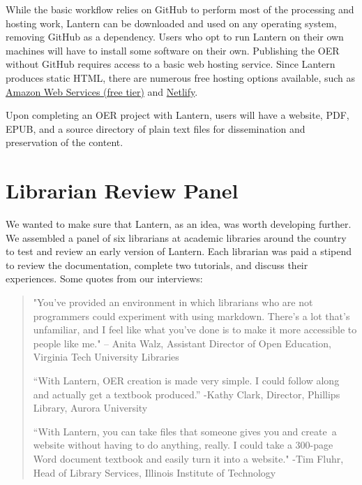 \documentclass{book}
\begin{document}
While the basic workflow relies on GitHub to perform most of the processing
and hosting work, Lantern can be downloaded and used on any operating system,
removing GitHub as a dependency. Users who opt to run Lantern on their own
machines will have to install some software on their own. Publishing the OER
without GitHub requires access to a basic web hosting service. Since Lantern
produces static HTML, there are numerous free hosting options available, such
as
\href{https://aws.amazon.com/free/?all-free-tier.sort-by=item.additionalFields.SortRank\&all-free-tier.sort-order=asc\&awsf.Free\%20Tier\%20Types=*all\&awsf.Free\%20Tier\%20Categories=*all}{Amazon
Web Services (free tier)} and \href{https://app.netlify.com/drop}{Netlify}.

Upon completing an OER project with Lantern, users will have a website, PDF,
EPUB, and a source directory of plain text files for dissemination and
preservation of the content.

\hypertarget{librarian-review-panel}{%
\section{Librarian Review Panel}\label{librarian-review-panel}}

We wanted to make sure that Lantern, as an idea, was worth developing further.
We assembled a panel of six librarians at academic libraries around the
country to test and review an early version of Lantern. Each librarian was
paid a stipend to review the documentation, complete two tutorials, and
discuss their experiences. Some quotes from our interviews:

\begin{quote}
"You've provided an environment in which librarians who are not programmers
could experiment with using markdown. There's a lot that's unfamiliar, and I
feel like what you've done is to make it more accessible to people like me."
-- Anita Walz, Assistant Director of Open Education, Virginia Tech University
Libraries

``With Lantern, OER creation is made very simple. I could follow along and
actually get a textbook produced.'' -Kathy Clark, Director, Phillips Library,
Aurora University

``With Lantern, you can take files that someone gives you and create~a website
without having to do anything, really. I could take a 300-page Word document
textbook and easily turn it into a website." -Tim Fluhr, Head of Library
Services, Illinois Institute of Technology
\end{quote}
\end{document}
